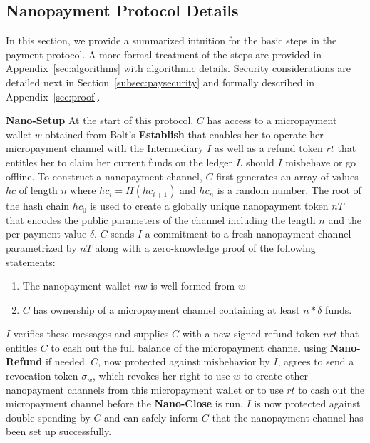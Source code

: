 \subsection{Nanopayment Protocol Details}
\label{sec:nanopaymentdetails}
In this section, we provide a summarized intuition for the basic steps in the
payment protocol. A more formal treatment of the steps are provided in
Appendix~\ref{sec:algorithms} with algorithmic details. Security considerations
are detailed next in Section~\ref{subsec:paysecurity} and formally described in
Appendix~\ref{sec:proof}.


\textbf{Nano-Setup} At the start of this protocol, $C$ has access to a
micropayment wallet $w$ obtained from Bolt's \textbf{Establish} that enables her
to operate her micropayment channel with the Intermediary $I$ as well as a
refund token $rt$ that entitles her to claim her current funds on the ledger $L$
should $I$ misbehave or go offline. To construct a nanopayment channel, $C$
first generates an array of values $hc$ of length $n$ where $hc_i = H(hc_{i+1})$
and $hc_n$ is a random number. The root of the hash chain $hc_0$ is used to
create a globally unique nanopayment token $nT$ that encodes the public
parameters of the channel including the length $n$ and the per-payment value
$\delta$. $C$ sends $I$ a commitment to a fresh nanopayment channel parametrized
by $nT$ along with a zero-knowledge proof of the following statements:

\begin{enumerate}
\item The nanopayment wallet $nw$ is well-formed from $w$
\item $C$ has ownership of a micropayment channel containing at least $n *
  \delta$ funds.
\end{enumerate}

$I$ verifies these messages and supplies $C$ with a new signed refund token
$nrt$ that entitles $C$ to cash out the full balance of the micropayment channel
using \textbf{Nano-Refund} if needed.
$C$, now protected against misbehavior by $I$, agrees to send a revocation token
$\sigma_w$, which revokes her right to use $w$ to create other nanopayment
channels from this micropayment wallet or to use $rt$ to cash out the
micropayment channel before the \textbf{Nano-Close} is run. $I$ is now protected
against double spending by $C$ and can safely inform $C$ that the nanopayment
channel has been set up successfully.


